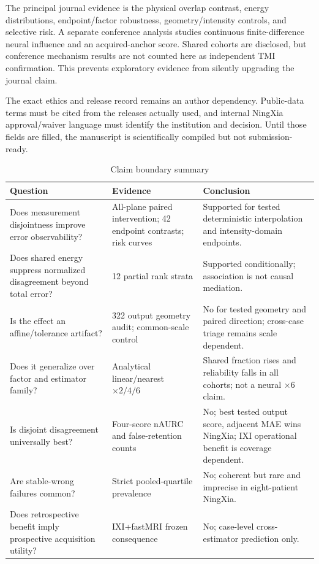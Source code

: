 \documentclass[journal,10pt]{IEEEtran}
\begin{document}
The principal journal evidence is the physical overlap contrast, energy distributions, endpoint/factor robustness, geometry/intensity controls, and selective risk. A separate conference analysis studies continuous finite-difference neural influence and an acquired-anchor score. Shared cohorts are disclosed, but conference mechanism results are not counted here as independent TMI confirmation. This prevents exploratory evidence from silently upgrading the journal claim.

The exact ethics and release record remains an author dependency. Public-data terms must be cited from the releases actually used, and internal NingXia approval/waiver language must identify the institution and decision. Until those fields are filled, the manuscript is scientifically compiled but not submission-ready.

\begin{table}[t]
\caption{Claim boundary summary}
\label{tab:claims}\centering
\begin{tabular}{p{4.2cm}p{4.1cm}p{7.0cm}}
\toprule
Question&Evidence&Conclusion\\
\midrule
Does measurement disjointness improve error observability?&All-plane paired intervention; 42 endpoint contrasts; risk curves&Supported for tested deterministic interpolation and intensity-domain endpoints.\\
Does shared energy suppress normalized disagreement beyond total error?&12 partial rank strata&Supported conditionally; association is not causal mediation.\\
Is the effect an affine/tolerance artifact?&322 output geometry audit; common-scale control&No for tested geometry and paired direction; cross-case triage remains scale dependent.\\
Does it generalize over factor and estimator family?&Analytical linear/nearest $\times2/4/6$&Shared fraction rises and reliability falls in all cohorts; not a neural $\times6$ claim.\\
Is disjoint disagreement universally best?&Four-score nAURC and false-retention counts&No; best tested output score, adjacent MAE wins NingXia; IXI operational benefit is coverage dependent.\\
Are stable-wrong failures common?&Strict pooled-quartile prevalence&No; coherent but rare and imprecise in eight-patient NingXia.\\
Does retrospective benefit imply prospective acquisition utility?&IXI+fastMRI frozen consequence&No; case-level cross-estimator prediction only.\\
\bottomrule
\end{tabular}
\end{table}
\end{document}
